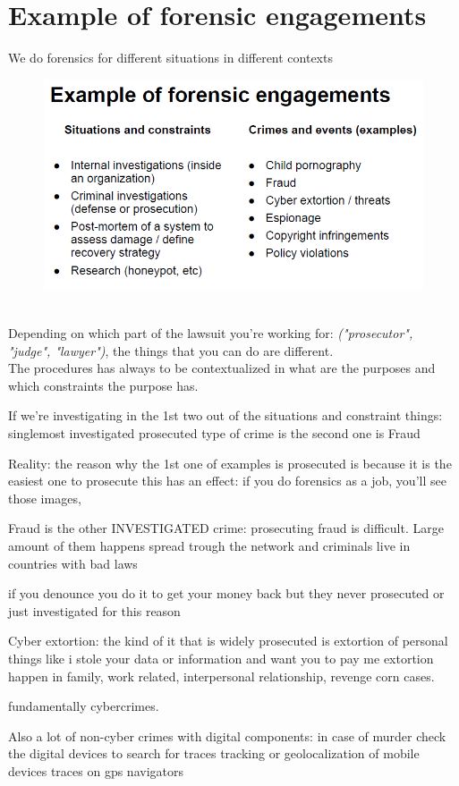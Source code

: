 \section{Example of forensic engagements}
    We do forensics for different situations in different contexts
    \begin{figure}[ht!]
        \centering
        \includegraphics[width=0.5\linewidth]{lecture_3/forensics.png}
    \end{figure}
    \\Depending on which part of the lawsuit you're working for: \textit{("prosecutor", "judge", "lawyer")}, the things that you can do are different.\\
    The procedures has always to be contextualized in what are the purposes and which constraints the purpose has.          

    If we're investigating in the 1st two out of the situations and constraint things:
        singlemost investigated prosecuted type of crime is %
        the second one is Fraud

        Reality: the reason why the 1st one of examples is prosecuted is because it is the easiest one to prosecute
        this has an effect: if you do forensics as a job, you'll see those images, 

    Fraud is the other INVESTIGATED crime: prosecuting fraud is difficult. Large amount of them happens spread trough the network and criminals live in countries with bad laws

    if you denounce you do it to get your money back but they never prosecuted or just investigated for this reason

    Cyber extortion: the kind of it that is widely prosecuted is extortion of personal things like i stole your data or information and want you to pay me
        extortion happen in family, work related, interpersonal relationship, revenge corn cases.

    fundamentally cybercrimes.

    Also a lot of non-cyber crimes with digital components:
        in case of murder check the digital devices to search for traces
        tracking or geolocalization of mobile devices 
        traces on gps navigators

